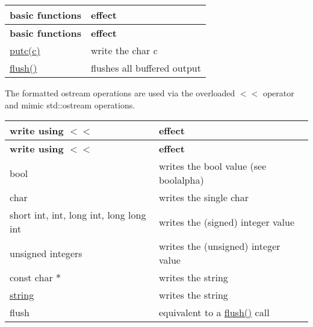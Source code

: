 \tabulinesep=1mm
\begin{longtabu} spread 0pt [c]{*{2}{|X[-1]}|}
\hline
\rowcolor{\tableheadbgcolor}\textbf{ basic functions }&\textbf{ effect  }\\
\endfirsthead
\hline
\endfoot
\hline
\rowcolor{\tableheadbgcolor}\textbf{ basic functions }&\textbf{ effect  }\\
\endhead
\hyperlink{classhwlib_1_1ostream_a3b2b77c9e933b76bd6ddd85b9883a31b}{putc(c)} &write the char c \\
\hyperlink{classhwlib_1_1ostream_a5f43f08159d2733e02805f134598f96a}{flush()} &flushes all buffered output \\
\end{longtabu}
The formatted ostream operations are used via the overloaded $<$$<$ operator and mimic std\+::ostream operations.

\tabulinesep=1mm
\begin{longtabu} spread 0pt [c]{*{2}{|X[-1]}|}
\hline
\rowcolor{\tableheadbgcolor}\textbf{ write using $<$$<$ }&\textbf{ effect  }\\
\endfirsthead
\hline
\endfoot
\hline
\rowcolor{\tableheadbgcolor}\textbf{ write using $<$$<$ }&\textbf{ effect  }\\
\endhead
bool &writes the bool value (see boolalpha) \\
char &writes the single char \\
short int, int, long int, long long int &writes the (signed) integer value \\
unsigned integers &writes the (unsigned) integer value \\
const char $\ast$ &writes the string \\
\hyperlink{classhwlib_1_1string}{string} &writes the string \\
flush &equivalent to a \hyperlink{namespacehwlib_a648fe94ca9899747a632c23f97007732}{flush()} call \\
\end{longtabu}
~\newline


